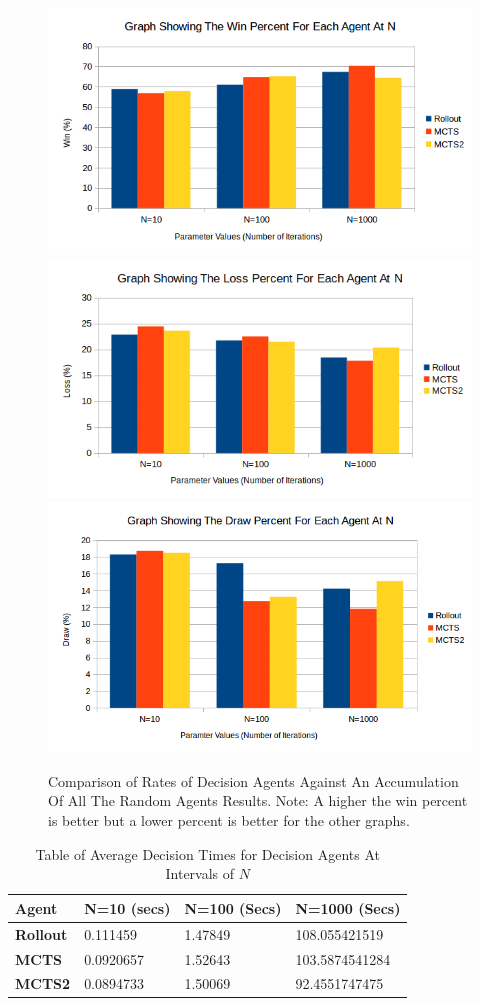 \documentclass[journal]{IEEEtran}
\begin{document}
\begin{figure}[h]
  \label{compare-param-graph}
  \includegraphics[width=.45\textwidth,scale=.75]{param_comparison_rnd_win}\\
  \includegraphics[width=.45\textwidth,scale=.75]{param_comparison_rnd_loss}\\
  \includegraphics[width=.45\textwidth,scale=.75]{param_comparison_rnd_draw}\\
  \caption{Comparison of Rates of Decision Agents Against An Accumulation Of All The Random Agents Results. Note: A higher the win percent is better but a lower percent is better for the other graphs.}
\end{figure}


\begin{table}[H]
\centering
\caption{Table of Average Decision Times for Decision Agents At Intervals of $N$}
\label{results-table-agent-times}
\def\arraystretch{2.0}%
\begin{tabular}{|l|l|l|l|}
\hline
\textbf{Agent}   & \textbf{N=10 (secs)} & \textbf{N=100 (Secs)} & \textbf{N=1000 (Secs)} \\ \hline
\textbf{Rollout} & 0.111459             & 1.47849               & 108.055421519          \\ \hline
\textbf{MCTS}    & 0.0920657            & 1.52643               & 103.5874541284         \\ \hline
\textbf{MCTS2}   & 0.0894733            & 1.50069               & 92.4551747475          \\ \hline
\end{tabular}
\end{table}
\end{document}
